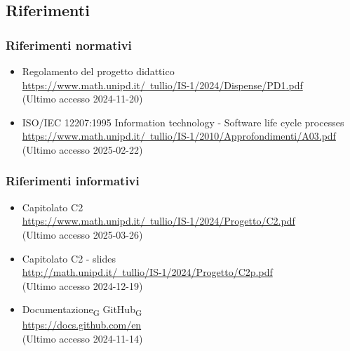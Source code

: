 \subsection{Riferimenti}
\subsubsection{Riferimenti normativi}
\begin{itemize}
    \item Regolamento del progetto didattico\\ \href{https://www.math.unipd.it/~tullio/IS-1/2024/Dispense/PD1.pdf}{https://www.math.unipd.it/~tullio/IS-1/2024/Dispense/PD1.pdf} \\ (Ultimo accesso 2024-11-20)
    \item ISO/IEC 12207:1995 Information technology - Software life cycle processes \\ \href{https://www.math.unipd.it/~tullio/IS-1/2010/Approfondimenti/A03.pdf}{https://www.math.unipd.it/~tullio/IS-1/2010/Approfondimenti/A03.pdf}\\ (Ultimo accesso 2025-02-22)

\end{itemize}

\subsubsection{Riferimenti informativi}
\begin{itemize}
    \item Capitolato C2 \\ \href{https://www.math.unipd.it/~tullio/IS-1/2024/Progetto/C2.pdf}{https://www.math.unipd.it/~tullio/IS-1/2024/Progetto/C2.pdf}\\ (Ultimo accesso 2025-03-26)
    \item Capitolato C2 - slides \\ \href{http://math.unipd.it/~tullio/IS-1/2024/Progetto/C2p.pdf}{http://math.unipd.it/~tullio/IS-1/2024/Progetto/C2p.pdf}\\ (Ultimo accesso 2024-12-19)
    \item Documentazione\textsubscript{G} GitHub\textsubscript{G} \\ \href{https://docs.github.com/en}{https://docs.github.com/en}\\ (Ultimo accesso 2024-11-14)
    
\end{itemize}